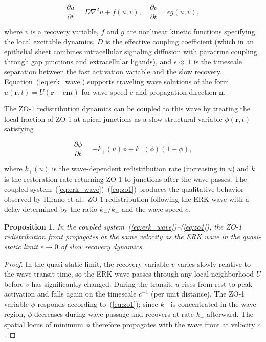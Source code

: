 \documentclass[11pt,a4paper]{article}
\theoremstyle{plain}
\newtheorem{proposition}[theorem]{Proposition}
\theoremstyle{definition}
\begin{document}
\begin{equation}
\frac{\partial u}{\partial t} = D \nabla^2 u + f(u, v),
\quad
\frac{\partial v}{\partial t} = \epsilon g(u, v),
\label{eq:erk_wave}
\end{equation}

where $v$ is a recovery variable, $f$ and $g$ are nonlinear kinetic functions
specifying the local excitable dynamics, $D$ is the effective coupling coefficient
(which in an epithelial sheet combines intracellular signaling diffusion with
paracrine coupling through gap junctions and extracellular ligands), and $\epsilon \ll 1$
is the timescale separation between the fast activation variable and the slow recovery.
Equation~(\ref{eq:erk_wave}) supports traveling wave solutions of the form
$u(\mathbf{r}, t) = U(\mathbf{r} - c\mathbf{n} t)$ for wave speed $c$ and propagation
direction $\mathbf{n}$.

The ZO-1 redistribution dynamics can be coupled to this wave by treating the local
fraction of ZO-1 at apical junctions as a slow structural variable $\phi(\mathbf{r}, t)$
satisfying

\begin{equation}
\frac{\partial \phi}{\partial t} = -k_+(u)\phi + k_-(\phi)(1-\phi),
\label{eq:zo1}
\end{equation}

where $k_+(u)$ is the wave-dependent redistribution rate (increasing in $u$) and $k_-$
is the restoration rate returning ZO-1 to junctions after the wave passes. The coupled
system~(\ref{eq:erk_wave})--(\ref{eq:zo1}) produces the qualitative behavior observed
by Hirano et al.: ZO-1 redistribution following the ERK wave with a delay determined
by the ratio $k_+/k_-$ and the wave speed $c$.

\begin{proposition}
In the coupled system~(\ref{eq:erk_wave})--(\ref{eq:zo1}), the ZO-1 redistribution
front propagates at the same velocity as the ERK wave in the quasi-static limit
$\epsilon \to 0$ of slow recovery dynamics.
\end{proposition}

\begin{proof}
In the quasi-static limit, the recovery variable $v$ varies slowly relative to the
wave transit time, so the ERK wave passes through any local neighborhood $U$ before
$v$ has significantly changed. During the transit, $u$ rises from rest to peak activation
and falls again on the timescale $c^{-1}$ (per unit distance). The ZO-1 variable $\phi$
responds according to~(\ref{eq:zo1}); since $k_+$ is concentrated in the wave region,
$\phi$ decreases during wave passage and recovers at rate $k_-$ afterward. The spatial
locus of minimum $\phi$ therefore propagates with the wave front at velocity $c$.
\end{proof}
\end{document}
